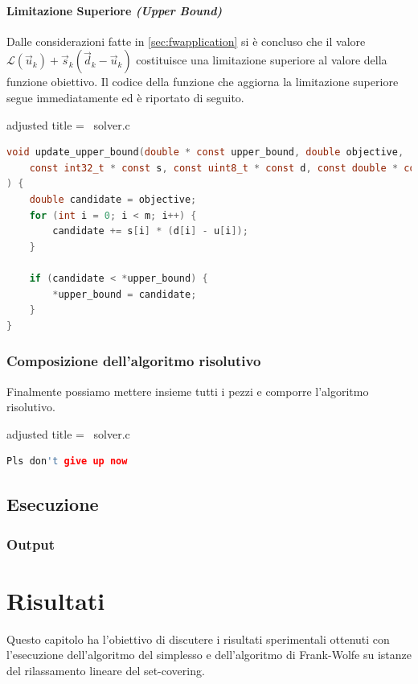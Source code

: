 \subsubsection{Limitazione Superiore \textit{(Upper Bound)}}
Dalle considerazioni fatte in \ref{sec:fwapplication} si è concluso che il valore
\(
    \mathcal{L}(\vec{u}_k) + \vec{s}_k(\vec{d}_k - \vec{u}_k)
\)
costituisce una limitazione superiore al valore della funzione obiettivo. Il codice della funzione che aggiorna la
limitazione superiore segue immediatamente ed è riportato di seguito.

\begin{code}{adjusted title = {\cicon\ solver.c}}
\begin{lstlisting}[language=c, style = style, caption={Aggiornamento della limitazione superiore.}]
void update_upper_bound(double * const upper_bound, double objective,
    const int32_t * const s, const uint8_t * const d, const double * const u
) {
    double candidate = objective;
    for (int i = 0; i < m; i++) {
        candidate += s[i] * (d[i] - u[i]);
    }

    if (candidate < *upper_bound) {
        *upper_bound = candidate;
    }
}
\end{lstlisting}
\end{code}

\subsection{Composizione dell'algoritmo risolutivo}
Finalmente possiamo mettere insieme tutti i pezzi e comporre l'algoritmo risolutivo.
\begin{code}{adjusted title = {\cicon\ solver.c}}
\begin{lstlisting}[language=c, style = style, caption={Implementazione dell'algoritmo risolutivo.}]
Pls don't give up now
\end{lstlisting}
\end{code}
\newpage

\section{Esecuzione}

\subsection{Output}

\chapter{Risultati}
Questo capitolo ha l'obiettivo di discutere i risultati sperimentali ottenuti con l'esecuzione
dell'algoritmo del simplesso e dell'algoritmo di Frank-Wolfe su istanze del rilassamento lineare del set-covering.

